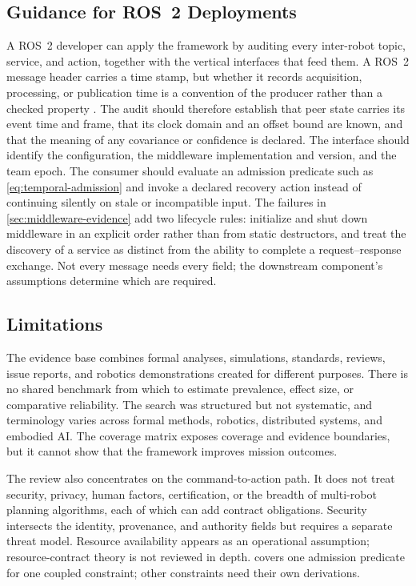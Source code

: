 \subsection{Guidance for ROS~2 Deployments}

A ROS~2 developer can apply the framework by auditing every inter-robot topic,
service, and action, together with the vertical interfaces that feed them.  A
ROS~2 message header carries a time stamp, but whether it records acquisition,
processing, or publication time is a convention of the producer rather than a
checked property \cite{macenski2022ros2}.  The audit should therefore establish
that peer state carries its event time and frame, that its clock domain and an
offset bound are known, and that the meaning of any covariance or confidence is
declared.  The interface should identify the configuration, the middleware
implementation and version, and the team epoch.  The consumer should evaluate
an admission predicate such as \eqref{eq:temporal-admission} and invoke a
declared recovery action instead of continuing silently on stale or
incompatible input.  The failures in \cref{sec:middleware-evidence} add two
lifecycle rules: initialize and shut down middleware in an explicit order rather
than from static destructors, and treat the discovery of a service as distinct
from the ability to complete a request--response exchange.  Not every message
needs every field; the downstream component's assumptions determine which are
required.

\subsection{Limitations}

The evidence base combines formal analyses, simulations, standards, reviews,
issue reports, and robotics demonstrations created for different purposes.
There is no shared benchmark from which to estimate prevalence, effect size, or
comparative reliability.  The search was structured but not systematic, and
terminology varies across formal methods, robotics, distributed systems, and
embodied AI.  The coverage matrix exposes coverage and evidence boundaries, but
it cannot show that the framework improves mission outcomes.

The review also concentrates on the command-to-action path.  It does not treat
security, privacy, human factors, certification, or the breadth of multi-robot
planning algorithms, each of which can add contract obligations.  Security
intersects the identity, provenance, and authority fields but requires a
separate threat model.  Resource availability appears as an operational
assumption; resource-contract theory is not reviewed in depth.
 covers one admission predicate for one coupled
constraint; other constraints need their own derivations.

